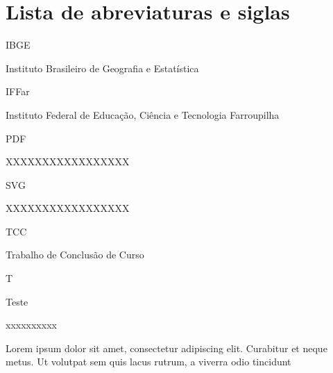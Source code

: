 \newcommand\siglaLargura{10ex} %
\newcommand\siglaGap{1ex} %
\newcommand\nomeSiglaLargura{\dimexpr\linewidth-\siglaLargura-\siglaGap\relax}
\newcommand\sigla[2]{\noindent\parbox[t]{\siglaLargura}{#1\strut}%
  \hspace{\siglaGap}%
  \parbox[t]{\nomeSiglaLargura}{#2\strut}}

\chapter*{Lista de abreviaturas e siglas}

\sigla{IBGE}{Instituto Brasileiro de Geografia e Estatística}

\sigla{IFFar}{Instituto Federal de Educação, Ciência e Tecnologia Farroupilha}

\sigla{PDF}{XXXXXXXXXXXXXXXXX}

\sigla{SVG}{XXXXXXXXXXXXXXXXX}

\sigla{TCC}{Trabalho de Conclusão de Curso}

\sigla{T}{Teste}

\sigla{xxxxxxxxxx}{Lorem ipsum dolor sit amet, consectetur adipiscing elit. Curabitur et neque metus. Ut volutpat sem quis lacus rutrum, a viverra odio tincidunt}